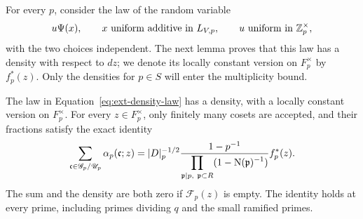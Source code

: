 For every \(p\), consider the law of the random variable
\begin{equation}
 u\Psi(x),\qquad x\ \text{uniform additive in }L_{V,p},\qquad
 u\ \text{uniform in }\mathbb Z_p^\times,
 \label{eq:ext-density-law}
\end{equation}
with the two choices independent.  The next lemma proves that this law
has a density with respect to \(dz\); we denote its locally constant
version on \(F_p^\times\) by \(f_p^*(z)\).  Only the densities for
\(p\in S\) will enter the multiplicity bound.

\begin{lemma}
\label{lem:ext-density}
The law in Equation~\eqref{eq:ext-density-law} has a density, with a
locally constant version on \(F_p^\times\).  For every \(z\in F_p^\times\),
only finitely many cosets are accepted, and their fractions satisfy the
exact identity
\begin{equation}
 \sum_{\mathfrak c\in\mathscr G_p/\mathscr U_p}
        \alpha_p(\mathfrak c;z)
 =
 |D|_p^{-1/2}
 \frac{1-p^{-1}}
      {\displaystyle\prod_{\mathfrak p\mid p,\ \mathfrak p\subset R}
                      (1-\operatorname{N}(\mathfrak p)^{-1})}
 f_p^*(z).
 \label{eq:ext-density-disintegration}
\end{equation}
The sum and the density are both zero if \(\mathscr F_p(z)\) is empty.
The identity holds at every prime, including primes dividing \(q\) and
the small ramified primes.
\end{lemma}

